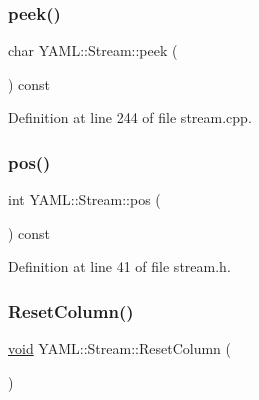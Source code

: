 \mbox{\label{class_y_a_m_l_1_1_stream_ab131746d2a9bb7bf8ab8765d16445fbc}} 
\subsubsection{\texorpdfstring{peek()}{peek()}}
{\footnotesize\ttfamily char Y\+A\+M\+L\+::\+Stream\+::peek (\begin{DoxyParamCaption}{ }\end{DoxyParamCaption}) const}



Definition at line 244 of file stream.\+cpp.

\mbox{\label{class_y_a_m_l_1_1_stream_a497b0f9891b3f62b3101c54df60b6eb2}} 
\subsubsection{\texorpdfstring{pos()}{pos()}}
{\footnotesize\ttfamily int Y\+A\+M\+L\+::\+Stream\+::pos (\begin{DoxyParamCaption}{ }\end{DoxyParamCaption}) const\hspace{0.3cm}{\ttfamily [inline]}}



Definition at line 41 of file stream.\+h.

\mbox{\label{class_y_a_m_l_1_1_stream_a34f1b7be035ae5862daac235159cd3cf}} 
\subsubsection{\texorpdfstring{ResetColumn()}{ResetColumn()}}
{\footnotesize\ttfamily \mbox{\hyperlink{glad_8h_a950fc91edb4504f62f1c577bf4727c29}{void}} Y\+A\+M\+L\+::\+Stream\+::\+Reset\+Column (\begin{DoxyParamCaption}{ }\end{DoxyParamCaption})\hspace{0.3cm}{\ttfamily [inline]}}



